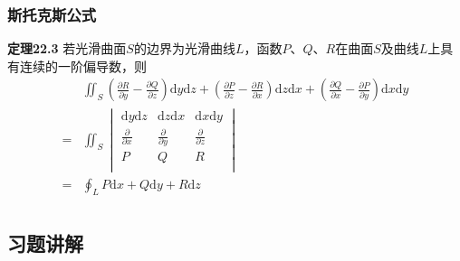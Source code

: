 \documentclass[xetex]{beamer}
\begin{document}
	\begin{frame}
		\frametitle{斯托克斯公式}
		\textbf{定理22.3}
		若光滑曲面$S$的边界为光滑曲线$L$，函数$P$、$Q$、$R$在曲面$S$及曲线$L$上具有连续的一阶偏导数，则
		\begin{equation*}
			\begin{split}
			&\iint_S(\frac{\partial R}{\partial y} - \frac{\partial Q}{\partial z})\mathrm{d} y \mathrm{d} z + 
			(\frac{\partial P}{\partial z} - \frac{\partial R}{\partial x})\mathrm{d} z \mathrm{d} x +
			(\frac{\partial Q}{\partial x} - \frac{\partial P}{\partial y})\mathrm{d} x \mathrm{d} y \\
			= & \iint_S
				\begin{vmatrix} 
					\mathrm{d} y \mathrm{d} z & \mathrm{d} z \mathrm{d} x & \mathrm{d} x \mathrm{d} y \\ 
					\frac{\partial }{\partial x} & \frac{\partial }{\partial y} & \frac{\partial }{\partial z} \\
					P & Q & R\\
				\end{vmatrix}\quad\\
			= & \oint_L P\mathrm{d} x + Q\mathrm{d} y + R\mathrm{d} z\\
			\end{split}
		\end{equation*}
	\end{frame}
	
	
	\begin{frame}
		\section{习题讲解}
	\end{frame}
	
\end{document}
